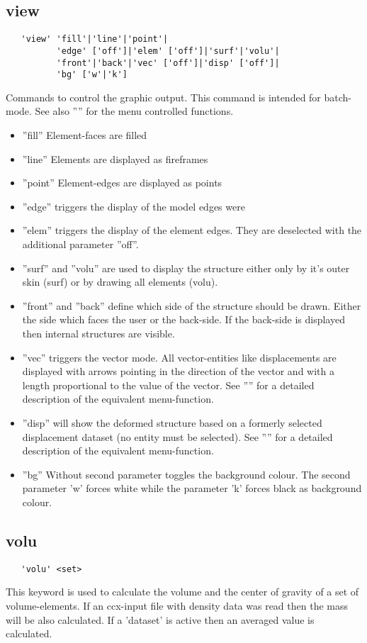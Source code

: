 \documentclass{article}
\begin{document}
\subsection{\label{view}view}
\begin{verbatim}
   'view' 'fill'|'line'|'point'|
          'edge' ['off']|'elem' ['off']|'surf'|'volu'|
          'front'|'back'|'vec' ['off']|'disp' ['off']|
          'bg' ['w'|'k']
\end{verbatim}
Commands to control the graphic output. This command is intended for batch-mode. See also '''' for the menu controlled functions.
\begin{itemize}
\item ''fill'' Element-faces are filled 
\item ''line'' Elements are displayed as fireframes
\item ''point'' Element-edges are displayed as points
\item ''edge'' triggers the display of the model edges were 
\item ''elem'' triggers the display of the element edges. They are deselected with the additional parameter ''off''.
\item ''surf'' and ''volu'' are used to display the structure either only by it's outer skin (surf) or by drawing all elements (volu). \item ''front'' and ''back'' define which side of the structure should be drawn. Either the side which faces the user or the back-side. If the back-side is displayed then internal structures are visible. 
\item ''vec'' triggers the vector mode. All vector-entities like displacements are displayed with arrows pointing in the direction of the vector and with a length proportional to the value of the vector. See '''' for a detailed description of the equivalent menu-function.
\item ''disp'' will show the deformed structure based on a formerly selected displacement dataset (no entity must be selected). See '''' for a detailed description of the equivalent menu-function.
\item ''bg'' Without second parameter toggles the background colour. The second parameter 'w' forces white while the parameter 'k' forces black as background colour.
\end{itemize}  

\subsection{\label{volu}volu}
\begin{verbatim}
   'volu' <set>
\end{verbatim}
This keyword is used to calculate the volume and the center of gravity of a set of volume-elements. If an ccx-input file with density data was read then the mass will be also calculated. If a 'dataset' is active then an averaged value is calculated.
\end{document}
